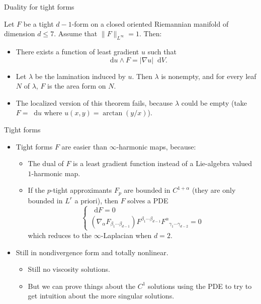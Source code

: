 \documentclass[10pt]{beamer}
\newcommand*\dif{\mathop{}\!\mathrm{d}}
\begin{document}
\begin{frame}{Duality for tight forms}

\begin{theorem}[B '24]
Let $F$ be a tight $d - 1$-form on a closed oriented Riemannian manifold of dimension $d \leq 7$.
Assume that $\|F\|_{L^\infty} = 1$.
Then: \pause
\begin{itemize}
\item There exists a function of least gradient $u$ such that
$$\dif u \wedge F = |\nabla u| \dif V.$$
\item Let $\lambda$ be the lamination induced by $u$. Then $\lambda$ is nonempty, and for every leaf $N$ of $\lambda$, $F$ is the area form on $N$. \pause
\end{itemize}
\end{theorem}

\begin{itemize}
\item The localized version of this theorem fails, because $\lambda$ could be empty (take $F = \dif u$ where $u(x, y) = \arctan(y/x)$).
\end{itemize}

\end{frame}

\begin{frame}{Tight forms}
\begin{itemize}
\item Tight forms $F$ are easier than $\infty$-harmonic maps, because:
\begin{itemize}
\item The dual of $F$ is a least gradient function instead of a Lie-algebra valued $1$-harmonic map.
\item If the $p$-tight approximants $F_p$ are bounded in $C^{1 + \alpha}$ (they are only bounded in $L^r$ a priori), then $F$ solves a PDE
$$\begin{cases}
    \dif F = 0 \\
    (\nabla_\alpha F_{\beta_1 \cdots \beta_{d - 1}}) F^{\beta_1 \cdots \beta_{d - 1}} {F^\alpha}_{\gamma_1 \cdots \gamma_{d - 2}} = 0
\end{cases}$$ 
which reduces to the $\infty$-Laplacian when $d = 2$. \pause
\end{itemize}
\item Still in nondivergence form and totally nonlinear.
\begin{itemize}
\item Still no viscosity solutions.
\item But we can prove things about the $C^1$ solutions using the PDE to try to get intuition about the more singular solutions.
\end{itemize}
\end{itemize}
\end{frame}
\end{document}
